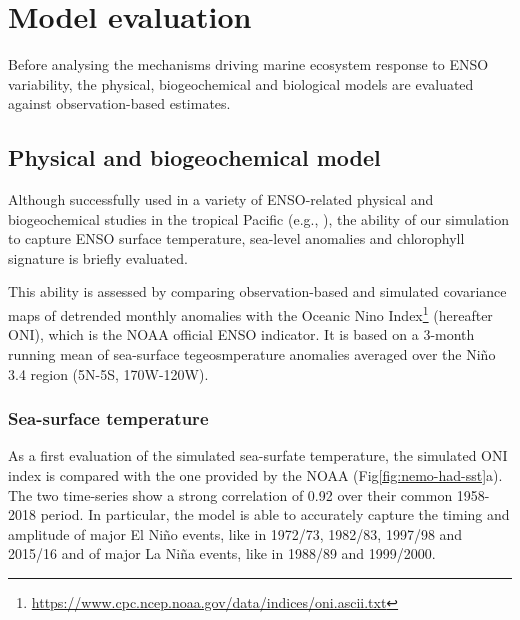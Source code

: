 \section{Model evaluation}

Before analysing the mechanisms driving marine ecosystem response to ENSO variability, the physical, biogeochemical and biological models are evaluated against observation-based estimates.

\subsection{Physical and biogeochemical model}

Although successfully used in a variety of ENSO-related physical and biogeochemical studies in the tropical Pacific (e.g., \citealt{vialardModelStudyOceanic2001, lengaigneOceanResponseMarch2002, lengaigneInfluenceOceanicBiology2007, schneiderClimateinducedInterannualVariability2008, masottiLargescaleShiftsPhytoplankton2011, currieIndianOceanDipole2013}), the ability of our simulation to capture ENSO surface temperature, sea-level anomalies and chlorophyll signature is briefly evaluated. 

This ability is assessed by comparing observation-based and simulated covariance maps of detrended monthly anomalies with the Oceanic Nino Index\footnote{\url{https://www.cpc.ncep.noaa.gov/data/indices/oni.ascii.txt}} (hereafter ONI), which is the NOAA official ENSO indicator. It is based on a 3-month running mean of sea-surface tegeosmperature anomalies averaged over the Niño 3.4 region (5N-5S, 170W-120W).


\subsubsection{Sea-surface temperature}
\label{sec:sst}

As a first evaluation of the simulated sea-surfate temperature, the simulated ONI index is compared with the one provided by the NOAA (Fig\ref{fig:nemo-had-sst}a). The two time-series show a strong correlation of 0.92 over their common 1958-2018 period. In particular, the model is able to accurately capture the timing and amplitude of major El Niño events, like in 1972/73, 1982/83, 1997/98 and 2015/16 and of major La Niña events, like in 1988/89 and 1999/2000. 

